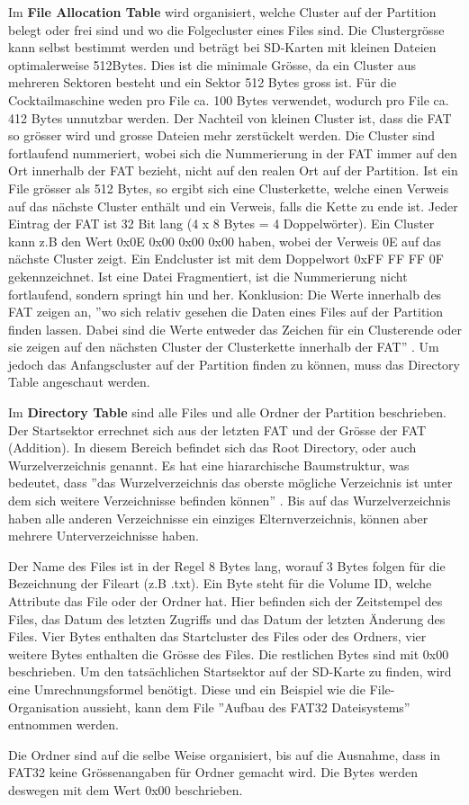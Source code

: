 Im \textbf{File Allocation Table} wird organisiert, welche Cluster auf der Partition belegt oder frei sind und wo die Folgecluster eines Files sind. Die Clustergrösse kann selbst bestimmt werden und beträgt bei SD-Karten mit kleinen Dateien optimalerweise 512Bytes. Dies ist die minimale Grösse, da ein Cluster aus mehreren Sektoren besteht und ein Sektor 512 Bytes gross ist. Für die Cocktailmaschine weden pro File ca. 100 Bytes verwendet, wodurch pro File ca. 412 Bytes unnutzbar werden. Der Nachteil von kleinen Cluster ist, dass die FAT so grösser wird und grosse Dateien mehr zerstückelt werden. Die Cluster sind fortlaufend nummeriert, wobei sich die Nummerierung in der FAT immer auf den Ort innerhalb der FAT bezieht, nicht auf den realen Ort auf der Partition. Ist ein File grösser als 512 Bytes, so ergibt sich eine Clusterkette, welche einen Verweis auf das nächste Cluster enthält und ein Verweis, falls die Kette zu ende ist. Jeder Eintrag der FAT ist 32 Bit lang (4 x 8 Bytes = 4 Doppelwörter). Ein Cluster kann z.B den Wert 0x0E 0x00 0x00 0x00 haben, wobei der Verweis 0E auf das nächste Cluster zeigt. Ein Endcluster ist mit dem Doppelwort 0xFF FF FF 0F gekennzeichnet. Ist eine Datei Fragmentiert, ist die Nummerierung nicht fortlaufend, sondern springt hin und her. Konklusion: Die Werte innerhalb des FAT zeigen an, ''wo sich relativ gesehen die Daten eines Files auf der Partition finden lassen. Dabei sind die Werte entweder das Zeichen für ein Clusterende oder sie zeigen auf den nächsten Cluster der Clusterkette innerhalb der FAT'' \cite{milsch_aufbau_2009}. Um jedoch das Anfangscluster auf der Partition finden zu können, muss das Directory Table angeschaut werden.

\newpage

Im \textbf{Directory Table} sind alle Files und alle Ordner der Partition beschrieben. Der Startsektor errechnet sich aus der letzten FAT und der Grösse der FAT (Addition). In diesem Bereich befindet sich das Root Directory, oder auch Wurzelverzeichnis genannt. Es hat eine hiararchische Baumstruktur, was bedeutet, dass ''das Wurzelverzeichnis das oberste mögliche Verzeichnis ist unter dem sich weitere Verzeichnisse befinden können'' \cite{milsch_aufbau_2009}. Bis auf das Wurzelverzeichnis haben alle anderen Verzeichnisse ein einziges Elternverzeichnis, können aber mehrere Unterverzeichnisse haben. \cite{informatikuni-ulmde_fat32slide_2002}

Der Name des Files ist in der Regel 8 Bytes lang, worauf 3 Bytes folgen für die Bezeichnung der Fileart (z.B .txt). Ein Byte steht für die Volume ID, welche Attribute das File oder der Ordner hat. Hier befinden sich der Zeitstempel des Files, das Datum des letzten Zugriffs und das Datum der letzten Änderung des Files. Vier Bytes enthalten das Startcluster des Files oder des Ordners, vier weitere Bytes enthalten die Grösse des Files. Die restlichen Bytes sind mit 0x00 beschrieben. Um den tatsächlichen Startsektor auf der SD-Karte zu finden, wird eine Umrechnungsformel benötigt. Diese und ein Beispiel wie die File-Organisation aussieht, kann dem File ''Aufbau des FAT32 Dateisystems'' entnommen werden.\cite{milsch_aufbau_2009}


Die Ordner sind auf die selbe Weise organisiert, bis auf die Ausnahme, dass in FAT32 keine Grössenangaben für Ordner gemacht wird. Die Bytes werden deswegen mit dem Wert 0x00 beschrieben.